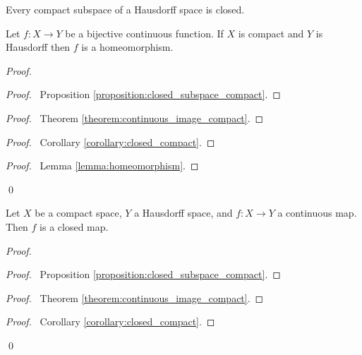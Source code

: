 \begin{corollary}
    \label{corollary:closed_compact}
    Every compact subspace of a Hausdorff space is closed.
\end{corollary}

\begin{theorem}
    Let $f : X \rightarrow Y$ be a bijective continuous function. If $X$ is
    compact and $Y$ is Hausdorff then $f$ is a homeomorphism.
\end{theorem}

\begin{proof}
    \pf
    \begin{proof}
        \pf\ Proposition \ref{proposition:closed_subspace_compact}.
    \end{proof}
    \begin{proof}
        \pf\ Theorem \ref{theorem:continuous_image_compact}.
    \end{proof}
    \begin{proof}
        \pf\ Corollary \ref{corollary:closed_compact}.
    \end{proof}
    \qedstep
    \begin{proof}
        \pf\ Lemma \ref{lemma:homeomorphism}.
    \end{proof}
    \qed
\end{proof}

\begin{proposition}
    \label{proposition:closed_map_compact_Hausdorff}
    Let $X$ be a compact space, $Y$ a Hausdorff space, and $f : X \rightarrow Y$
    a continuous map. Then $f$ is a closed map.
\end{proposition}

\begin{proof}
    \pf
    \begin{proof}
        \pf\ Proposition \ref{proposition:closed_subspace_compact}.
    \end{proof}
    \begin{proof}
        \pf\ Theorem \ref{theorem:continuous_image_compact}.
    \end{proof}
    \begin{proof}
        \pf\ Corollary \ref{corollary:closed_compact}.
    \end{proof}
    \qed
\end{proof}

